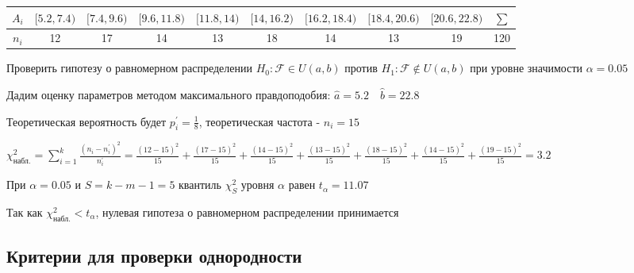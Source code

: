 \documentclass[12pt]{article}
\begin{document}
\begin{tabular}{c|c|c|c|c|c|c|c|c|c}
    $A_i$ & $[5.2, 7.4)$ & $[7.4, 9.6)$ & $[9.6, 11.8)$ & $[11.8, 14)$ & $[14, 16.2)$ & $[16.2, 18.4)$ & $[18.4, 20.6)$ & $[20.6, 22.8)$ & $\sum$ \\
    \hline
    $n_i$ & 12 & 17 & 14 & 13 & 18 & 14 & 13 & 19 & 120
\end{tabular}

Проверить гипотезу о равномерном распределении $H_0 : \mathcal{F} \in U(a, b)$ против $H_1 : \mathcal{F} \not\in U(a, b)$ при уровне значимости $\alpha = 0.05$

Дадим оценку параметров методом максимального правдоподобия: $\hat a = 5.2 \quad \hat b = 22.8$

Теоретическая вероятность будет $p_i^\prime = \frac{1}{8}$, теоретическая частота - $n_i = 15$

$\chi^2_\text{набл.} = \sum_{i = 1}^k \frac{(n_i - n_i^\prime)^2}{n_i^\prime} = \frac{(12 - 15)^2}{15} + 
\frac{(17 - 15)^2}{15} + \frac{(14 - 15)^2}{15} + \frac{(13 - 15)^2}{15} + \frac{(18 - 15)^2}{15} + 
\frac{(14 - 15)^2}{15} + \frac{(19 - 15)^2}{15} = 3.2$

При $\alpha = 0.05$ и $S = k - m - 1 = 5$ квантиль $\chi^2_S$ уровня $\alpha$ равен $t_\alpha = 11.07$

Так как $\chi^2_\text{набл.} < t_\alpha$, нулевая гипотеза о равномерном распределении принимается

\subsection{Критерии для проверки однородности}
\end{document}

